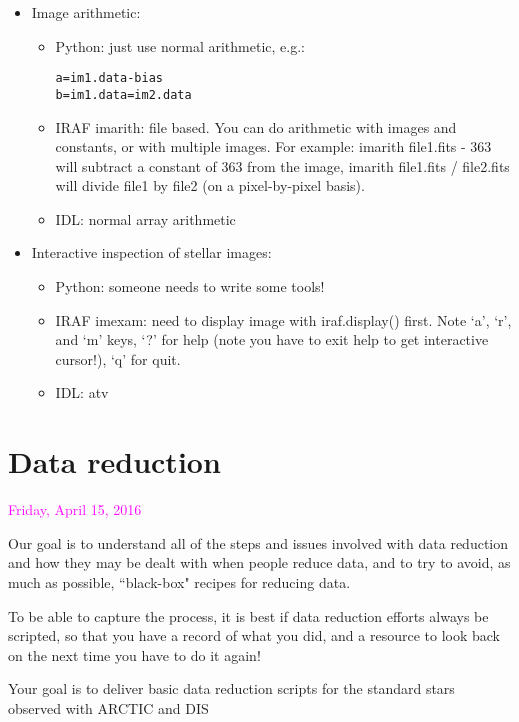 \documentclass{article}
\begin{document}
\begin{itemize}
\item Image arithmetic:
    \begin{itemize}
        \item Python: just use normal arithmetic, e.g.:
            \begin{verbatim}
a=im1.data-bias
b=im1.data=im2.data
            \end{verbatim}
        \item IRAF imarith: file based. You can do arithmetic with images and
            constants, or with multiple images. For example: imarith
            file1.fits - 363 will subtract a constant of 363 from the image,
            imarith file1.fits / file2.fits will divide file1 by file2 (on a
            pixel-by-pixel basis).
        \item IDL: normal array arithmetic
    \end{itemize}

\item Interactive inspection of stellar images:
    \begin{itemize}
        \item Python: someone needs to write some tools!
        \item IRAF imexam: need to display image with iraf.display() first. Note
            `a', `r', and `m' keys, `?' for help (note you have to exit help
            to get interactive cursor!), `q' for quit.
        \item IDL: atv
    \end{itemize}
\end{itemize}

\section*{Data reduction}
\textcolor{magenta}{Friday, April 15, 2016}

Our goal is to understand all of the steps and issues involved with
data reduction and how they may be dealt with when people reduce data,
and to try to avoid, as much as possible, ``black-box" recipes for
reducing data.

To be able to capture the process, it is best if data reduction
efforts always be scripted, so that you have a record of what you did,
and a resource to look back on the next time you have to do it again!

Your goal is to deliver basic data reduction scripts for the standard
stars observed with ARCTIC and DIS
\end{document}
